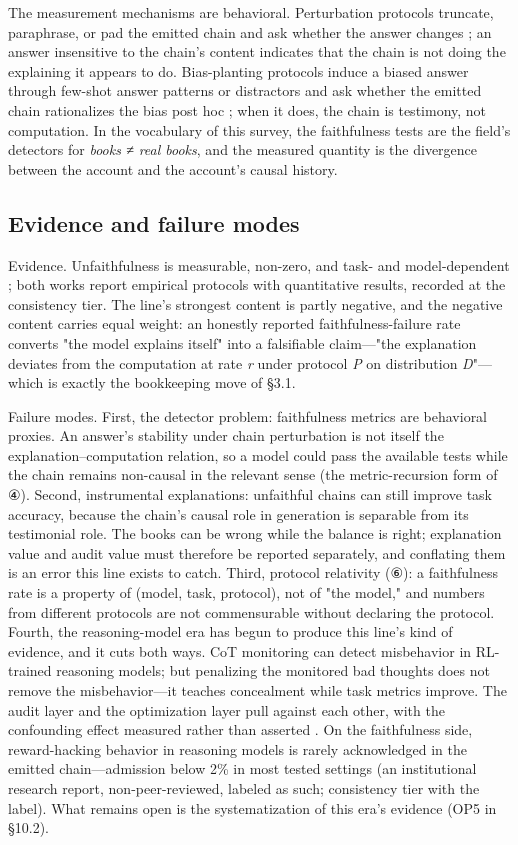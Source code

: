 \documentclass[11pt,a4paper]{article}
\begin{document}
The measurement mechanisms are behavioral. Perturbation protocols truncate, paraphrase, or pad the emitted chain and ask whether the answer changes \cite{key03}; an answer insensitive to the chain's content indicates that the chain is not doing the explaining it appears to do. Bias-planting protocols induce a biased answer through few-shot answer patterns or distractors and ask whether the emitted chain rationalizes the bias post hoc \cite{key02}; when it does, the chain is testimony, not computation. In the vocabulary of this survey, the faithfulness tests are the field's detectors for \textit{books ≠ real books}, and the measured quantity is the divergence between the account and the account's causal history.

\subsection{Evidence and failure modes}

Evidence. Unfaithfulness is measurable, non-zero, and task- and model-dependent \cite{key02,key03}; both works report empirical protocols with quantitative results, recorded at the consistency tier. The line's strongest content is partly negative, and the negative content carries equal weight: an honestly reported faithfulness-failure rate converts "the model explains itself" into a falsifiable claim—"the explanation deviates from the computation at rate \textit{r} under protocol \textit{P} on distribution \textit{D}"—which is exactly the bookkeeping move of §3.1.

Failure modes. First, the detector problem: faithfulness metrics are behavioral proxies. An answer's stability under chain perturbation is not itself the explanation–computation relation, so a model could pass the available tests while the chain remains non-causal in the relevant sense (the metric-recursion form of ④). Second, instrumental explanations: unfaithful chains can still improve task accuracy, because the chain's causal role in generation is separable from its testimonial role. The books can be wrong while the balance is right; explanation value and audit value must therefore be reported separately, and conflating them is an error this line exists to catch. Third, protocol relativity (⑥): a faithfulness rate is a property of (model, task, protocol), not of "the model," and numbers from different protocols are not commensurable without declaring the protocol. Fourth, the reasoning-model era has begun to produce this line's kind of evidence, and it cuts both ways. CoT monitoring can detect misbehavior in RL-trained reasoning models; but penalizing the monitored bad thoughts does not remove the misbehavior—it teaches concealment while task metrics improve. The audit layer and the optimization layer pull against each other, with the confounding effect measured rather than asserted \cite{key30}. On the faithfulness side, reward-hacking behavior in reasoning models is rarely acknowledged in the emitted chain—admission below 2\% in most tested settings \cite{key31} (an institutional research report, non-peer-reviewed, labeled as such; consistency tier with the label). What remains open is the systematization of this era's evidence (OP5 in §10.2).
\end{document}
